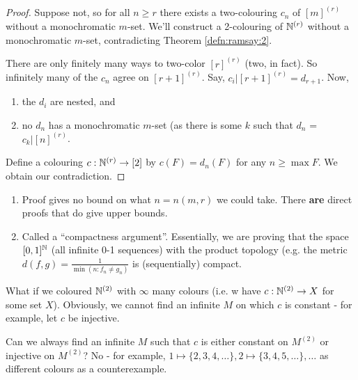 \begin{proof}
  Suppose not, so for all $n \geq r$ there exists a two-colouring
  $c_{n}$ of $[m]^{(r)}$ without a monochromatic $m$-set.  We'll
  construct a 2-colouring of $\mathbb{N}^{(r)}$ without a monochromatic
  $m$-set, contradicting Theorem \ref{defn:ramsay:2}.

  There are only finitely many ways to two-color $[r]^{(r)}$ (two, in
  fact). So infinitely many of the $c_{n}$ agree on $[r + 1]^{(r)}$.
  Say, $c_{i} | [r+1]^{(r)} = d_{r+1}$. Now, 
  \begin{enumerate}
  \item the $d_{i}$ are nested, and
  \item no $d_{n}$ has a monochromatic $m$-set (as there is some $k$
    such that $d_{n}$ = $c_{k} | [n]^{(r)}$.
  \end{enumerate}

  Define a colouring $c: \mathbb{N}^{(r)} \rightarrow [2]$ by $c(F) =
  d_{n}(F)$ for any $n \geq \max F$.  We obtain our contradiction.
\end{proof}

\begin{remark}
  \begin{enumerate}
  \item Proof gives no bound on what $n = n(m, r)$ we could take.
    There \textbf{are} direct proofs that do give upper bounds.
  \item Called a ``compactness argument''.  Essentially, we are
    proving that the space $[0, 1]^{\mathbb{N}}$ (all infinite 0-1 sequences)
    with the product topology (e.g. the metric $d(f, g) =
    \frac{1}{\min(n: f_{n} \neq g_{n})}$ is (sequentially) compact.
  \end{enumerate}
\end{remark}

What if we coloured $\mathbb{N}^{(2)}$ with $\infty$ many colours (i.e. w have
$c: \mathbb{N}^{(2)} \rightarrow X$ for some set $X$).  Obviously, we cannot
find an infinite $M$ on which $c$ is constant - for example, let $c$
be injective.

Can we always find an infinite $M$ such that $c$ is either constant on
$M^{(2)}$ or injective on $M^{(2)}$?  No - for example, $1 \mapsto
\{2,3,4, \dots \}, 2 \mapsto \{ 3, 4, 5, \dots \}, \dots$ as different
colours as a counterexample.

